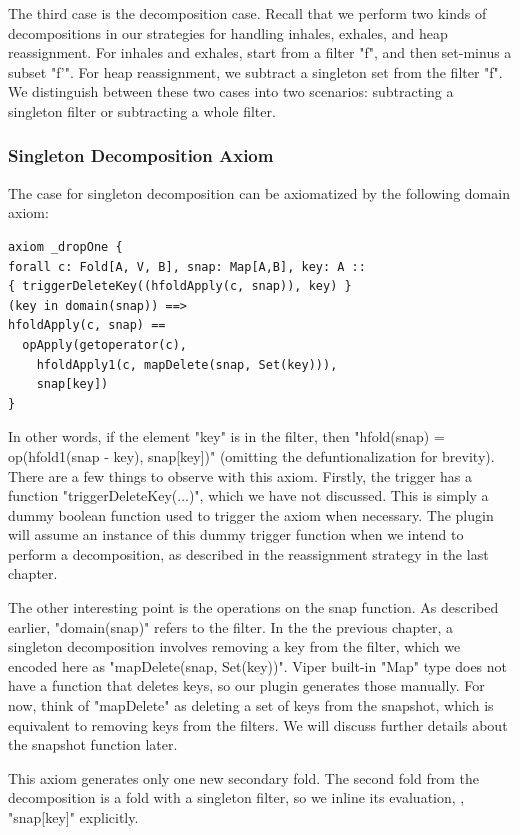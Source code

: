 \documentclass[msc,oneside]{ubcthesis}
\begin{document}
The third case is the decomposition case. Recall that we perform two kinds of decompositions in our strategies for handling inhales, exhales, and heap reassignment. For inhales and exhales, start from a filter "f", and then set-minus a subset "f'". For heap reassignment, we subtract a singleton set from the filter "f". We distinguish between these two cases into two scenarios: subtracting a singleton filter or subtracting a whole filter.

\subsubsection{Singleton Decomposition Axiom}
The case for singleton decomposition can be axiomatized by the following domain axiom:
\begin{lstlisting}
axiom _dropOne {
forall c: Fold[A, V, B], snap: Map[A,B], key: A ::
{ triggerDeleteKey((hfoldApply(c, snap)), key) }
(key in domain(snap)) ==>
hfoldApply(c, snap) == 
  opApply(getoperator(c), 
    hfoldApply1(c, mapDelete(snap, Set(key))), 
    snap[key])
}
\end{lstlisting}
In other words, if the element "key" is in the filter, then "hfold(snap) = op(hfold1(snap - key), snap[key])" (omitting the defuntionalization for brevity). There are a few things to observe with this axiom. Firstly, the trigger has a function "triggerDeleteKey(...)", which we have not discussed. This is simply a dummy boolean function used to trigger the axiom when necessary. The plugin will assume an instance of this dummy trigger function when we intend to perform a decomposition, as described in the reassignment strategy in the last chapter.

The other interesting point is the operations on the snap function. As described earlier, "domain(snap)" refers to the filter. In the the previous chapter, a singleton decomposition involves removing a key from the filter, which we encoded here as "mapDelete(snap, Set(key))". Viper built-in "Map" type does not have a function that deletes keys, so our plugin generates those manually. For now, think of "mapDelete" as deleting a set of keys from the snapshot, which is equivalent to removing keys from the filters. We will discuss further details about the snapshot function later.

This axiom generates only one new secondary fold. The second fold from the decomposition is a fold with a singleton filter, so we inline its evaluation, \ie, "snap[key]" explicitly.
\end{document}
